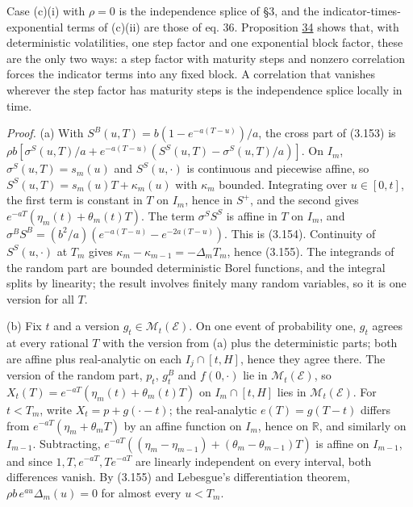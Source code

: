 \documentclass[11pt]{article}
\begin{document}
Case (c)(i) with \(\rho=0\) is the independence splice of \cite{gellert2021short} §3, and the indicator-times-exponential terms of (c)(ii) are those of \cite{brace2024sofr} eq. 36. Proposition \hyperref[res:Proposition-34]{34} shows that, with deterministic volatilities, one step factor and one exponential block factor, these are the only two ways: a step factor with maturity steps and nonzero correlation forces the indicator terms into any fixed block. A correlation that vanishes wherever the step factor has maturity steps is the independence splice locally in time.

\emph{Proof.} (a) With \(S^B(u,T)=b(1-e^{-a(T-u)})/a\), the cross part of (3.153) is \(\rho b[\sigma^S(u,T)/a+e^{-a(T-u)}(S^S(u,T)-\sigma^S(u,T)/a)]\). On \(I_m\), \(\sigma^S(u,T)=s_m(u)\) and \(S^S(u,\cdot)\) is continuous and piecewise affine, so \(S^S(u,T)=s_m(u)T+\kappa_m(u)\) with \(\kappa_m\) bounded. Integrating over \(u\in[0,t]\), the first term is constant in \(T\) on \(I_m\), hence in \(S^+\), and the second gives \(e^{-aT}(\eta_m(t)+\theta_m(t)T)\). The term \(\sigma^SS^S\) is affine in \(T\) on \(I_m\), and \(\sigma^BS^B=(b^2/a)(e^{-a(T-u)}-e^{-2a(T-u)})\). This is (3.154). Continuity of \(S^S(u,\cdot)\) at \(T_m\) gives \(\kappa_m-\kappa_{m-1}=-\Delta_mT_m\), hence (3.155). The integrands of the random part are bounded deterministic Borel functions, and the integral splits by linearity; the result involves finitely many random variables, so it is one version for all \(T\).

(b) Fix \(t\) and a version \(g_t\in\mathcal M_t(\mathcal E)\). On one event of probability one, \(g_t\) agrees at every rational \(T\) with the version from (a) plus the deterministic parts; both are affine plus real-analytic on each \(I_j\cap[t,H]\), hence they agree there. The version of the random part, \(p_t\), \(g^B_t\) and \(f(0,\cdot)\) lie in \(\mathcal M_t(\mathcal E)\), so \(X_t(T)=e^{-aT}(\eta_m(t)+\theta_m(t)T)\) on \(I_m\cap[t,H]\) lies in \(\mathcal M_t(\mathcal E)\). For \(t<T_m\), write \(X_t=p+g(\cdot-t)\); the real-analytic \(e(T)=g(T-t)\) differs from \(e^{-aT}(\eta_m+\theta_mT)\) by an affine function on \(I_m\), hence on \(\mathbb R\), and similarly on \(I_{m-1}\). Subtracting, \(e^{-aT}((\eta_m-\eta_{m-1})+(\theta_m-\theta_{m-1})T)\) is affine on \(I_{m-1}\), and since \(1,T,e^{-aT},Te^{-aT}\) are linearly independent on every interval, both differences vanish. By (3.155) and Lebesgue's differentiation theorem, \(\rho b\,e^{au}\Delta_m(u)=0\) for almost every \(u<T_m\).
\end{document}
